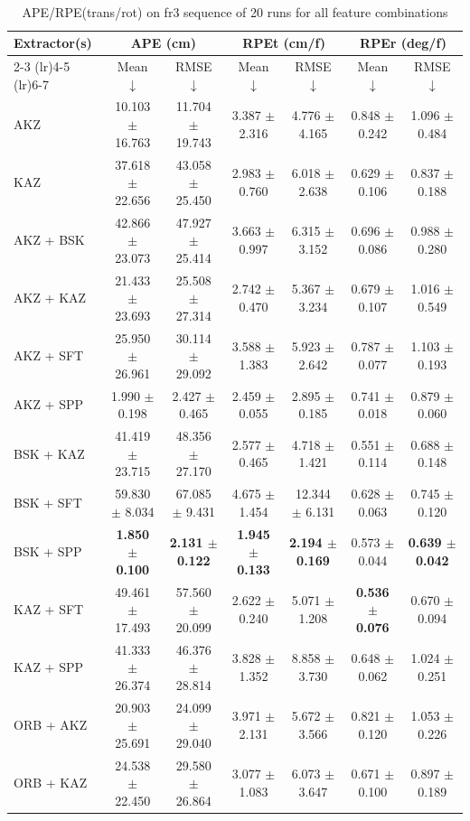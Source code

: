 \begin{table}[hbp]
\centering
\caption{APE/RPE(trans/rot) on fr3 sequence of 20 runs for all feature combinations}
\scriptsize
\label{tab:fr3_ape_rpe}\
\setlength{\tabcolsep}{3pt}
\begin{tabular}{lcccccc}
\toprule
\textbf{Extractor(s)}
& \multicolumn{2}{c}{\textbf{APE (cm)}}
& \multicolumn{2}{c}{\textbf{RPEt (cm/f)}}
& \multicolumn{2}{c}{\textbf{RPEr (deg/f)}} \\
\cmidrule(lr){2-3} \cmidrule(lr){4-5} \cmidrule(lr){6-7}
& Mean $\downarrow$ & RMSE $\downarrow$
& Mean $\downarrow$ & RMSE $\downarrow$
& Mean $\downarrow$ & RMSE $\downarrow$ \\
\midrule
AKZ & 10.103 $\pm$ 16.763 & 11.704 $\pm$ 19.743 & 3.387 $\pm$ 2.316 & 4.776 $\pm$ 4.165 & 0.848 $\pm$ 0.242 & 1.096 $\pm$ 0.484 \\
KAZ & 37.618 $\pm$ 22.656 & 43.058 $\pm$ 25.450 & 2.983 $\pm$ 0.760 & 6.018 $\pm$ 2.638 & 0.629 $\pm$ 0.106 & 0.837 $\pm$ 0.188 \\
AKZ + BSK & 42.866 $\pm$ 23.073 & 47.927 $\pm$ 25.414 & 3.663 $\pm$ 0.997 & 6.315 $\pm$ 3.152 & 0.696 $\pm$ 0.086 & 0.988 $\pm$ 0.280 \\
AKZ + KAZ & 21.433 $\pm$ 23.693 & 25.508 $\pm$ 27.314 & 2.742 $\pm$ 0.470 & 5.367 $\pm$ 3.234 & 0.679 $\pm$ 0.107 & 1.016 $\pm$ 0.549 \\
AKZ + SFT & 25.950 $\pm$ 26.961 & 30.114 $\pm$ 29.092 & 3.588 $\pm$ 1.383 & 5.923 $\pm$ 2.642 & 0.787 $\pm$ 0.077 & 1.103 $\pm$ 0.193 \\
AKZ + SPP & 1.990 $\pm$ 0.198 & 2.427 $\pm$ 0.465 & 2.459 $\pm$ 0.055 & 2.895 $\pm$ 0.185 & 0.741 $\pm$ 0.018 & 0.879 $\pm$ 0.060 \\
BSK + KAZ & 41.419 $\pm$ 23.715 & 48.356 $\pm$ 27.170 & 2.577 $\pm$ 0.465 & 4.718 $\pm$ 1.421 & 0.551 $\pm$ 0.114 & 0.688 $\pm$ 0.148 \\
BSK + SFT & 59.830 $\pm$ 8.034 & 67.085 $\pm$ 9.431 & 4.675 $\pm$ 1.454 & 12.344 $\pm$ 6.131 & 0.628 $\pm$ 0.063 & 0.745 $\pm$ 0.120 \\
BSK + SPP & \textbf{1.850 $\pm$ 0.100} & \textbf{2.131 $\pm$ 0.122} & \textbf{1.945 $\pm$ 0.133} & \textbf{2.194 $\pm$ 0.169} & 0.573 $\pm$ 0.044 & \textbf{0.639 $\pm$ 0.042} \\
KAZ + SFT & 49.461 $\pm$ 17.493 & 57.560 $\pm$ 20.099 & 2.622 $\pm$ 0.240 & 5.071 $\pm$ 1.208 & \textbf{0.536 $\pm$ 0.076} & 0.670 $\pm$ 0.094 \\
KAZ + SPP & 41.333 $\pm$ 26.374 & 46.376 $\pm$ 28.814 & 3.828 $\pm$ 1.352 & 8.858 $\pm$ 3.730 & 0.648 $\pm$ 0.062 & 1.024 $\pm$ 0.251 \\
ORB + AKZ & 20.903 $\pm$ 25.691 & 24.099 $\pm$ 29.040 & 3.971 $\pm$ 2.131 & 5.672 $\pm$ 3.566 & 0.821 $\pm$ 0.120 & 1.053 $\pm$ 0.226 \\
ORB + KAZ & 24.538 $\pm$ 22.450 & 29.580 $\pm$ 26.864 & 3.077 $\pm$ 1.083 & 6.073 $\pm$ 3.647 & 0.671 $\pm$ 0.100 & 0.897 $\pm$ 0.189 \\
\bottomrule
\end{tabular}
\end{table}